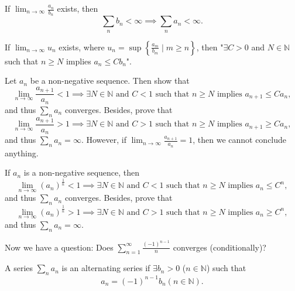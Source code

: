 \begin{corollary}
    If \(\lim_{n \to \infty} \frac{a_n}{b_n} \) exists, then 
    \[
        \sum_{n} b_n < \infty \implies \sum_{n} a_n < \infty. 
    \] 
\end{corollary}

\begin{exercise}
    If \(\lim_{n \to \infty} u_n\) exists, where \(u_n = \sup \left\{ \frac{a_m}{b_m} \mid m \ge n \right\} \), then "\(\exists C > 0\) and \(N \in \mathbb{N} \) such that \(n \ge N\) implies \(a_n \le C b_n\)".  
\end{exercise}
\begin{exercise}
    Let \(a_n\) be a non-negative sequence. Then show that 
    \[
        \lim_{n \to \infty} \frac{a_{n+1}}{a_n} < 1 \implies \exists N \in \mathbb{N} \text{ and } C < 1 \text{ such that } n \ge N \text{ implies } a_{n+1} \le C a_n,  
    \] and thus \(\sum_{n} a_n \) converges. Besides, prove that  
    \[
        \lim_{n \to \infty} \frac{a_{n+1}}{a_n} > 1 \implies \exists N \in \mathbb{N} \text{ and } C > 1 \text{ such that } n \ge N \text{ implies } a_{n+1} \ge C a_n,  
    \]and thus \(\sum_{n} a_n = \infty  \). However, if \(\lim_{n \to \infty} \frac{a_{n+1}}{a_n} = 1 \), then we cannot conclude anything.  
\end{exercise}
\begin{exercise}
    If \(a_n\) is a non-negative sequence, then 
    \[
        \lim_{n \to \infty} \left( a_n \right)^{\frac{1}{n}} < 1 \implies \exists N \in \mathbb{N} \text{ and } C < 1 \text{ such that } n \ge N \text{ implies } a_{n} \le C^n,
    \] and thus \(\sum_{n} a_n \) converges. Besides, prove that 
    \[
        \lim_{n \to \infty} \left( a_n \right)^{\frac{1}{n}} > 1 \implies \exists N \in \mathbb{N} \text{ and } C > 1 \text{ such that } n \ge N \text{ implies } a_{n} \ge C^n,
    \] and thus \(\sum_{n} a_n = \infty  \). 
\end{exercise}

Now we have a question: Does \(\sum_{n=1}^{\infty} \frac{(-1)^{n-1}}{n} \) converges (conditionally)?
\newpage

\begin{definition}
    A series \(\sum_{n} a_n \) is an alternating series if \(\exists b_n > 0\) (\(n \in \mathbb{N} \)) such that
    \[
        a_n = (-1)^{n-1} b_n (n \in \mathbb{N} ).
    \]
\end{definition}

